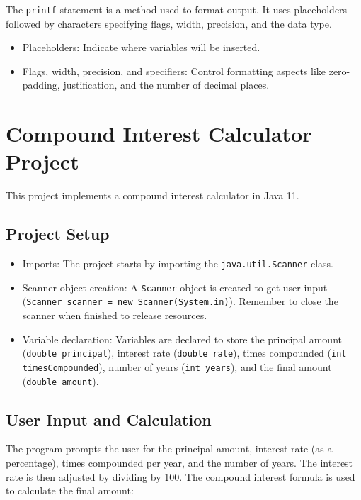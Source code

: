 \documentclass{article}
\begin{document}
The \texttt{printf} statement is a method used to format output.  It uses placeholders followed by characters specifying flags, width, precision, and the data type.

\begin{itemize}
    \item Placeholders: Indicate where variables will be inserted.
    \item Flags, width, precision, and specifiers: Control formatting aspects like zero-padding, justification, and the number of decimal places.
\end{itemize}


\section{Compound Interest Calculator Project}

This project implements a compound interest calculator in Java 11.

\subsection{Project Setup}

\begin{itemize}
    \item Imports:  The project starts by importing the \texttt{java.util.Scanner} class.
    \item Scanner object creation: A \texttt{Scanner} object is created to get user input (\texttt{Scanner scanner = new Scanner(System.in)}).  Remember to close the scanner when finished to release resources.
    \item Variable declaration: Variables are declared to store the principal amount (\texttt{double principal}), interest rate (\texttt{double rate}), times compounded (\texttt{int timesCompounded}), number of years (\texttt{int years}), and the final amount (\texttt{double amount}).
\end{itemize}

\subsection{User Input and Calculation}

The program prompts the user for the principal amount, interest rate (as a percentage), times compounded per year, and the number of years.  The interest rate is then adjusted by dividing by 100. The compound interest formula is used to calculate the final amount:
\end{document}
